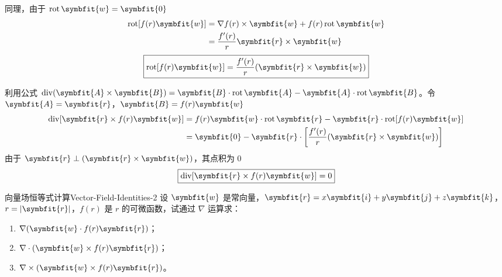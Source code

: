 \begin{solution}
    同理，由于 $\operatorname{rot} \symbfit{w} = \symbfit{0}$
    \begin{equation}
        \begin{aligned}
            \operatorname{rot} [f(r) \symbfit{w}] & = \nabla f(r) \times \symbfit{w} + f(r) \operatorname{rot} \symbfit{w} \\
                                                          & = \frac{f'(r)}{r} \symbfit{r} \times \symbfit{w}
        \end{aligned}
    \end{equation}
    \begin{equation}
        \boxed{\operatorname{rot} [f(r) \symbfit{w}] = \frac{f'(r)}{r} (\symbfit{r} \times \symbfit{w})}
    \end{equation}


    利用公式 $\operatorname{div} (\symbfit{A} \times \symbfit{B}) = \symbfit{B} \cdot \operatorname{rot} \symbfit{A} - \symbfit{A} \cdot \operatorname{rot} \symbfit{B}$。令 $\symbfit{A} = \symbfit{r}$，$\symbfit{B} = f(r) \symbfit{w}$
    \begin{equation}
        \begin{aligned}
            \operatorname{div} [\symbfit{r} \times f(r) \symbfit{w}] & = f(r) \symbfit{w} \cdot \operatorname{rot} \symbfit{r} - \symbfit{r} \cdot \operatorname{rot} [f(r) \symbfit{w}] \\
                                                                     & = \symbfit{0} - \symbfit{r} \cdot \left[ \frac{f'(r)}{r} (\symbfit{r} \times \symbfit{w}) \right]
        \end{aligned}
    \end{equation}
    由于 $\symbfit{r} \perp (\symbfit{r} \times \symbfit{w})$，其点积为 $0$
    \begin{equation}
        \boxed{\operatorname{div} [\symbfit{r} \times f(r) \symbfit{w}] = 0}
    \end{equation}
\end{solution}


\begin{problem}{向量场恒等式计算}{Vector-Field-Identities-2}
    设 $\symbfit{w}$ 是常向量，$\symbfit{r} = x\symbfit{i} + y\symbfit{j} + z\symbfit{k}$，$r = |\symbfit{r}|$，$f(r)$ 是 $r$ 的可微函数，试通过 $\nabla$ 运算求：
    \begin{enumerate}
        \item $\nabla(\symbfit{w} \cdot f(r)\symbfit{r})$；
        \item $\nabla \cdot (\symbfit{w} \times f(r)\symbfit{r})$；
        \item $\nabla \times (\symbfit{w} \times f(r)\symbfit{r})$。
    \end{enumerate}
\end{problem}

